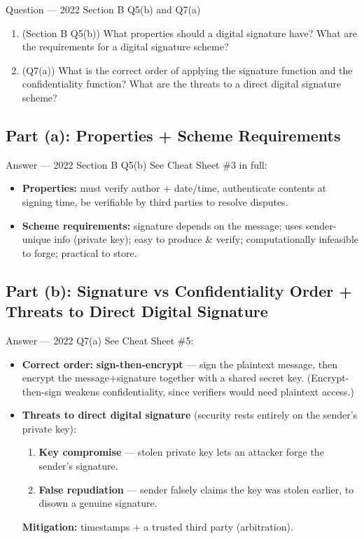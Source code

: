\documentclass[12pt,a4paper]{article}
\begin{document}
\begin{qbox}{Question --- 2022 Section B Q5(b) and Q7(a)}
\begin{enumerate}[label=(\alph*)]
  \item (Section B Q5(b)) What properties should a digital signature have? What are the requirements for a digital signature scheme?
  \item (Q7(a)) What is the correct order of applying the signature function and the confidentiality function? What are the threats to a direct digital signature scheme?
\end{enumerate}
\end{qbox}

\subsection{Part (a): Properties + Scheme Requirements}
\begin{solbox}{Answer --- 2022 Section B Q5(b)}
See Cheat Sheet \#3 in full:
\begin{itemize}[noitemsep]
  \item \textbf{Properties:} must verify author + date/time, authenticate contents at signing time, be verifiable by third parties to resolve disputes.
  \item \textbf{Scheme requirements:} signature depends on the message; uses sender-unique info (private key); easy to produce \& verify; computationally infeasible to forge; practical to store.
\end{itemize}
\end{solbox}

\subsection{Part (b): Signature vs Confidentiality Order + Threats to Direct Digital Signature}
\begin{solbox}{Answer --- 2022 Q7(a)}
See Cheat Sheet \#5:
\begin{itemize}[noitemsep]
  \item \textbf{Correct order:} \textbf{sign-then-encrypt} --- sign the plaintext message, then encrypt the message+signature together with a shared secret key. (Encrypt-then-sign weakens confidentiality, since verifiers would need plaintext access.)
  \item \textbf{Threats to direct digital signature} (security rests entirely on the sender's private key):
  \begin{enumerate}[noitemsep]
    \item \textbf{Key compromise} --- stolen private key lets an attacker forge the sender's signature.
    \item \textbf{False repudiation} --- sender falsely claims the key was stolen earlier, to disown a genuine signature.
  \end{enumerate}
  \textbf{Mitigation:} timestamps + a trusted third party (arbitration).
\end{itemize}
\end{solbox}
\end{document}

